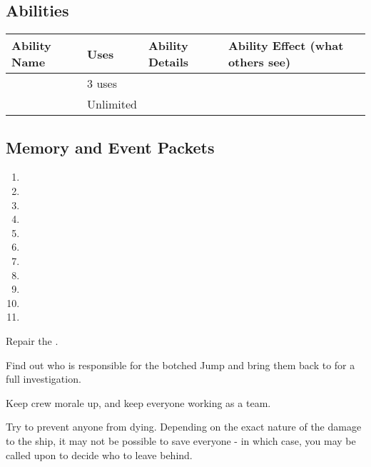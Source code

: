 \documentclass[char]{TMFHope}
\begin{document}
\subsection*{Abilities}
\begin{tabular}{|p{3cm}|p{1.5cm}|p{8cm}|p{3.5cm}|} 
 \hline
 \textbf{Ability Name} & \textbf{Uses} & \textbf{Ability Details} & \textbf{Ability Effect (what others see)} \\ 
\hline
 \aTruth{\MYname} & 3 uses & \aTruth{\MYtext} & \aTruth{\MYeffect} \\
\hline
 \aCalculate{\MYname} & Unlimited & \aCalculate{\MYtext} & \aCalculate{\MYeffect} \\ 
 \hline
\end{tabular}

\subsection*{Memory and Event Packets}
\begin{enumerate}
	\item \mPractice{\MYname}
	\item \mCAlpha{\MYname}
	\item \mCaptainOne{\MYname}
	\item \mCaptainTwo{\MYname}
	\item \mBroom{\MYname}
	\item \mLab{\MYname}
	\item \mPatient{\MYname}
	\item \mKitchen{\MYname}
	\item \mWeight{\MYname}
	\item \mTheater{\MYname}
	\item \mCrates{\MYname}
\end{enumerate}

\begin{itemz}[Goals]
	\item Repair the \pNew{}.
	\item Find out who is responsible for the botched Jump and bring them back to \pHome{} for a full investigation.
	\item Keep crew morale up, and keep everyone working as a team.
	\item Try to prevent anyone from dying. Depending on the exact nature of the damage to the ship, it may not be possible to save everyone - in which case, you may be called upon to decide who to leave behind.
\end{itemz}
\end{document}
